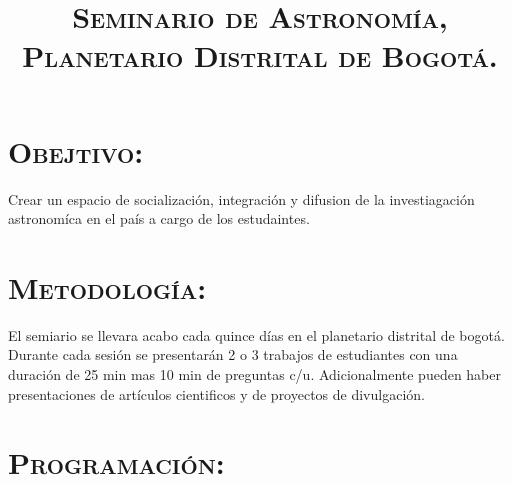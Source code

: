 \documentclass[12pt]{article}
\title{\textsc{Seminario de Astronom\'ia,\\ Planetario Distrital de Bogot\'a.}}
\begin{document}
\date{}
\maketitle

\section*{\textsc{Obejtivo:}}
Crear un espacio de socializaci\'on, integraci\'on y difusion de la investiagaci\'on astronom\'ica en el pa\'is
a cargo de los estudaintes.     

\section*{\textsc{Metodolog\'ia:}}
El semiario se llevara acabo cada quince d\'ias en el planetario distrital de bogot\'a.
Durante cada sesi\'on se presentar\'an 2 o 3 trabajos de estudiantes con una duraci\'on de 25 min mas 10 min de 
preguntas c/u. Adicionalmente pueden haber presentaciones de art\'iculos cientificos y de proyectos de divulgaci\'on.


\section*{\textsc{Programaci\'on:}}
\end{document}
